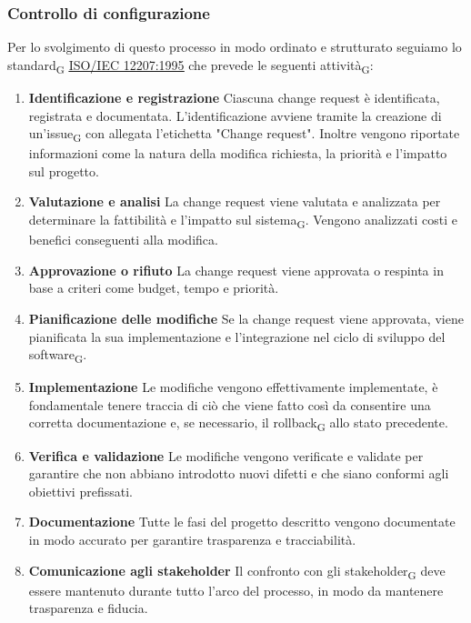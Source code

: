 {{\subsubsection{Controllo di configurazione}
Per lo svolgimento di questo processo in modo ordinato e strutturato seguiamo lo {standard\textsubscript{G}} 
\href{https://www.math.unipd.it/~tullio/IS-1/2009/Approfondimenti/ISO_12207-1995.pdf}{\underline{ISO/IEC 12207:1995}}
che prevede le seguenti {attività\textsubscript{G}}:
\begin{enumerate}
    \item \textbf{Identificazione e registrazione} Ciascuna change request è identificata, registrata e documentata. L'identificazione avviene
    tramite la creazione di un'{issue\textsubscript{G}} con allegata l'etichetta "Change request".
    Inoltre vengono riportate informazioni come la natura della modifica richiesta, la priorità e l'impatto sul progetto.
    \item \textbf{Valutazione e analisi} La change request viene valutata e analizzata per determinare la fattibilità e l'impatto sul 
    {sistema\textsubscript{G}}. Vengono analizzati costi e benefici conseguenti alla modifica.
    \item \textbf{Approvazione o rifiuto} La change request viene approvata o respinta in base a criteri come budget, tempo e priorità.
    \item \textbf{Pianificazione delle modifiche} Se la change request viene approvata, viene pianificata la sua implementazione e l'integrazione 
    nel ciclo di sviluppo del {software\textsubscript{G}}.
    \item \textbf{Implementazione} Le modifiche vengono effettivamente implementate, è fondamentale tenere traccia di ciò che viene fatto così
    da consentire una corretta documentazione e, se necessario, il {rollback\textsubscript{G}} allo stato precedente.
    \item \textbf{Verifica e validazione} Le modifiche vengono verificate e validate per garantire che non abbiano introdotto nuovi difetti
    e che siano conformi agli obiettivi prefissati.
    \item \textbf{Documentazione} Tutte le fasi del progetto descritto vengono documentate in modo accurato per garantire trasparenza e
    tracciabilità.
    \item \textbf{Comunicazione agli stakeholder} Il confronto con gli {stakeholder\textsubscript{G}} deve essere mantenuto
    durante tutto l'arco del processo, in modo da mantenere trasparenza e fiducia.
\end{enumerate}

}}
